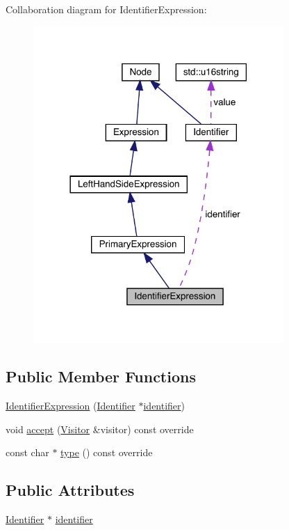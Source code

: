Collaboration diagram for Identifier\+Expression\+:\nopagebreak
\begin{figure}[H]
\begin{center}
\leavevmode
\includegraphics[width=270pt]{struct_identifier_expression__coll__graph}
\end{center}
\end{figure}
\subsection*{Public Member Functions}
\begin{DoxyCompactItemize}
\item 
\hyperlink{struct_identifier_expression_a187a16250972ed7afdd1cfc1972cffa8}{Identifier\+Expression} (\hyperlink{struct_identifier}{Identifier} $\ast$\hyperlink{struct_identifier_expression_ae22855c1fc8a900db6cce6e74db3f6cc}{identifier})
\item 
void \hyperlink{struct_identifier_expression_a95666fc6c9f12f7beec4db0131beadf8}{accept} (\hyperlink{struct_visitor}{Visitor} \&visitor) const override
\item 
const char $\ast$ \hyperlink{struct_identifier_expression_ab864c277df4f446b14cdc06e2fa5f7ad}{type} () const override
\end{DoxyCompactItemize}
\subsection*{Public Attributes}
\begin{DoxyCompactItemize}
\item 
\hyperlink{struct_identifier}{Identifier} $\ast$ \hyperlink{struct_identifier_expression_ae22855c1fc8a900db6cce6e74db3f6cc}{identifier}
\end{DoxyCompactItemize}


